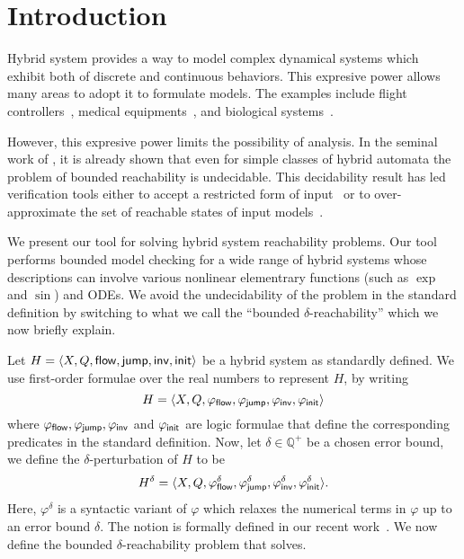 \section{Introduction}


Hybrid system provides a way to model complex dynamical systems which
exhibit both of discrete and continuous behaviors. This expresive
power allows many areas to adopt it to formulate models. The examples
include flight controllers~\cite{?}, medical equipments~\cite{?}, and
biological systems~\cite{?}.

However, this expresive power limits the possibility of analysis. In
the seminal work of
\cite{DBLP:conf/rex/AlurD91,DBLP:conf/hybrid/AlurCHH92}, it is already
shown that even for simple classes of hybrid automata the problem of
bounded reachability is undecidable. This decidability result has led
verification tools either to accept a restricted form of
input~\cite{?} or to over-approximate the set of reachable states of
input models~\cite{?}.

We present our tool \dReach{} for solving hybrid system
reachability problems. Our tool performs bounded model checking for a
wide range of hybrid systems whose descriptions can involve various
nonlinear elementrary functions (such as $\exp$ and $\sin$) and
ODEs. We avoid the undecidability of the problem in the standard
definition by switching to what we call the ``bounded
$\delta$-reachability'' which we now briefly explain.

Let $H = \langle X, Q, \mathsf{flow}, \mathsf{jump}, \mathsf{inv}, \mathsf{init}\rangle$ be a hybrid
system as standardly defined. We use first-order formulae over the
real numbers to represent $H$, by writing $$H = \langle X, Q,
\varphi_{\mathsf{flow}}, \varphi_{\mathsf{jump}}, \varphi_{\mathsf{inv}},
\varphi_{\mathsf{init}}\rangle$$ where $\varphi_{\mathsf{flow}}, \varphi_{\mathsf{jump}},
\varphi_{\mathsf{inv}}$ and $\varphi_{\mathsf{init}}$ are logic formulae that define
the corresponding predicates in the standard definition. Now, let
$\delta\in \mathbb{Q}^+$ be a chosen error bound, we define the
$\delta$-perturbation of $H$ to be $$H^{\delta} = \langle X, Q,
\varphi_{\mathsf{flow}}^{\delta}, \varphi_{\mathsf{jump}}^{\delta},
\varphi_{\mathsf{inv}}^{\delta}, \varphi_{\mathsf{init}}^{\delta}\rangle.$$ Here,
$\varphi^{\delta}$ is a syntactic variant of $\varphi$ which relaxes
the numerical terms in $\varphi$ up to an error bound $\delta$. The
notion is formally defined in our recent
work~\cite{DBLP:conf/lics/GaoAC12,DBLP:conf/cade/GaoAC12,DBLP:journals/corr/GaoKCC14}.
We now define the bounded $\delta$-reachability problem that
\dReach{} solves.

